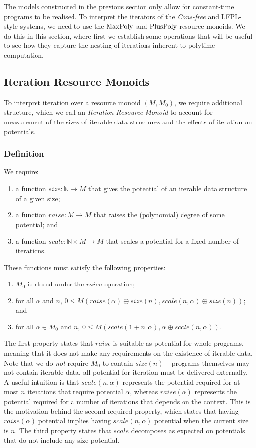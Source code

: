 \documentclass[acmsmall,screen]{acmart}
\newcommand{\ConsFree}{\emph{Cons-free}}
\begin{document}
The models constructed in the previous section only allow for
constant-time programs to be realised. To interpret the iterators of
the \ConsFree{} and LFPL-style systems, we need to use the
$\mathrm{MaxPoly}$ and $\mathrm{PlusPoly}$ resource monoids. We do this in this
section, where first we establish some operations that will be useful
to see how they capture the nesting of iterations inherent to polytime
computation.

\subsection{Iteration Resource Monoids}

To interpret iteration over a resource monoid $(M, M_0)$, we require
additional structure, which we call an \emph{Iteration Resource
  Monoid} to account for measurement of the sizes of iterable data
structures and the effects of iteration on potentials.

\subsubsection{Definition}
We require:
\begin{enumerate}
\item a function $\mathit{size} : \mathbb{N} \to M$ that gives the
  potential of an iterable data structure of a given
  size;
\item a function $\mathit{raise} : M \to M$ that raises the
  (polynomial) degree of some potential; and
\item a function $\mathit{scale} : \mathbb{N} \times M \to M$ that
  scales a potential for a fixed number of iterations.
\end{enumerate}
These functions must satisfy the following properties:
\begin{enumerate}
\item $M_0$ is closed under the $\mathit{raise}$ operation;
\item for all $\alpha$ and $n$,
  $0 \leq M(\mathit{raise}(\alpha) \oplus \mathit{size}(n),
  \mathit{scale}(n,\alpha) \oplus \mathit{size}(n))$; and
\item for all $\alpha \in M_0$ and $n$,
  $0 \leq M(\mathit{scale}(1 + n, \alpha), \alpha \oplus
  \mathit{scale}(n, \alpha))$.
\end{enumerate}
The first property states that $\mathit{raise}$ is suitable as
potential for whole programs, meaning that it does not make any
requirements on the existence of iterable data. Note that we do
\emph{not} require $M_0$ to contain $\mathit{size}(n)$ -- programs
themselves may not contain iterable data, all potential for iteration
must be delivered externally. A useful intuition is that
$\mathit{scale}(n,\alpha)$ represents the potential required for at
most $n$ iterations that require potential $\alpha$, whereas
$\mathit{raise}(\alpha)$ represents the potential required for a
number of iterations that depends on the context. This is the
motivation behind the second required property, which states that
having $\mathit{raise}(\alpha)$ potential implies having
$\mathit{scale}(n,\alpha)$ potential when the current size is $n$. The
third property states that $\mathit{scale}$ decomposes as expected on
potentials that do not include any size potential.
\end{document}
